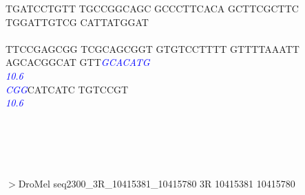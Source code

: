\documentclass[11pt,twoside,reqno,a4paper]{article}
\begin{document}
{TGATCCTGTT	TGCCGGCAGC	GCCCTTCACA	GCTTCGCTTC	TGGATTGTCG	CATTATGGAT	\\
\hspace*{1\charwidth}\hspace*{1\charwidth}\hspace*{1\charwidth}\hspace*{1\charwidth}\hspace*{1\charwidth}\hspace*{1\charwidth}\\
TTCCGAGCGG	TCGCAGCGGT	GTGTCCTTTT	GTTTTAAATT	AGCACGGCAT	GTT\textit{\textcolor{Blue}{G}}\textit{\textcolor{Blue}{C}}\textit{\textcolor{Blue}{A}}\textit{\textcolor{Blue}{C}}\textit{\textcolor{Blue}{A}}\textit{\textcolor{Blue}{T}}\textit{\textcolor{Blue}{G}}	\\
\hspace*{1\charwidth}\hspace*{1\charwidth}\hspace*{1\charwidth}\hspace*{1\charwidth}\hspace*{1\charwidth}\hspace*{53\charwidth}\textit{\textcolor{Blue}{10.6}}\hspace*{1\charwidth}\\
\textit{\textcolor{Blue}{C}}\textit{\textcolor{Blue}{G}}\textit{\textcolor{Blue}{G}}CATCATC	TGTCCGT\\
\hspace*{0\charwidth}\textit{\textcolor{Blue}{10.6}}\hspace*{1\charwidth}\\
\\
\\
\\
\\
}
\\
$>$DroMel	seq2300\_3R\_10415381\_10415780	3R	10415381	10415780 \\
 \\
\end{document}
